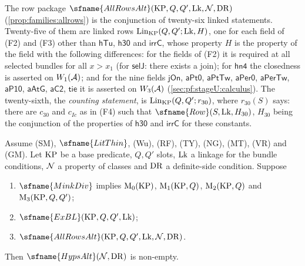 The row package $\sfname{AllRowsAlt}(\stageUKP,Q,Q',\stageULk,\stageUNN,\stageUDR)$ (\cref{prop:families:allrows}) is the
conjunction of twenty-six linked statements. Twenty-five of them are linked rows $\mathrm{Lin}_{\mathrm{KP}}(Q,Q';\mathrm{Lk},H)$,
one for each field of (F2) and (F3) other than $\mathsf{hTu}$, $\mathsf{h30}$ and $\mathsf{irrC}$, whose property $H$ is the
property of the field with the following differences: for the fields of (F2) it is required at all selected bundles for all
$x>x_1$ (for $\mathsf{selJ}$: there exists a join); for $\mathsf{hn4}$ the closedness is asserted on $W_1(\mathcal{A})$; and
for the nine fields $\mathsf{jOn}$, $\mathsf{aPt0}$, $\mathsf{aPtTw}$, $\mathsf{aPer0}$, $\mathsf{aPerTw}$, $\mathsf{aP10}$,
$\mathsf{aAtG}$, $\mathsf{aC2}$, $\mathsf{tie}$ it is asserted on $W_3(\mathcal{A})$ (\cref{sec:pf:stageU:calculus}). The
twenty-sixth, the \emph{counting statement}, is $\mathrm{Lin}_{\mathrm{KP}}(Q,Q';r_{30})$, where $r_{30}(S)$ says: there are
$c_{30}$ and $c_{Ic}$ as in (F4) such that $\sfname{Row}(S,\stageULk,H_{30})$, $H_{30}$ being the conjunction of the
properties of $\mathsf{h30}$ and $\mathsf{irrC}$ for these constants.

\begin{theorem}\label{pf:stageU:allrows}
Assume \textup{(SM)}, $\sfname{LitThin}$, \textup{(Wu)}, \textup{(RF)}, \textup{(TY)}, \textup{(NG)}, \textup{(MT)},
\textup{(VR)} and \textup{(GM)}. Let $\mathrm{KP}$ be a base predicate, $Q,Q'$ slots, $\mathrm{Lk}$ a linkage for the bundle
conditions, $\mathcal{N}$ a property of classes and $\mathrm{DR}$ a definite-side condition. Suppose
\begin{enumerate}[label=(\roman*)]
\item $\sfname{MinkDiv}$ implies $\mathrm{M}_0(\mathrm{KP})$, $\mathrm{M}_1(\mathrm{KP},Q)$, $\mathrm{M}_2(\mathrm{KP},Q)$ and
$\mathrm{M}_3(\mathrm{KP},Q,Q')$;
\item $\sfname{ExBL}(\stageUKP,Q,Q',\stageULk)$;
\item $\sfname{AllRowsAlt}(\stageUKP,Q,Q',\stageULk,\stageUNN,\stageUDR)$.
\end{enumerate}
Then $\sfname{HypsAlt}(\stageUNN,\stageUDR)$ is non-empty.
\end{theorem}

